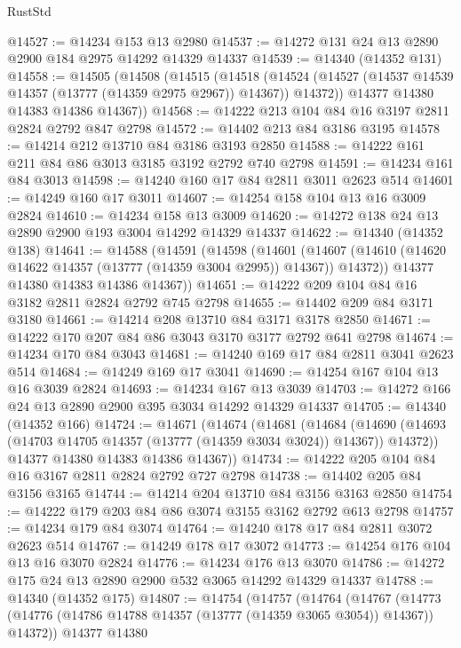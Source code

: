 \begin{lexlean}{RustStd}
\begin{coremodule}
@14527 := @14234 @153 @13 @2980
@14537 := @14272 @131 @24 @13 @2890 @2900 @184 @2975 @14292 @14329 @14337
@14539 := @14340 (@14352 @131)
@14558 := @14505
    (@14508
      (@14515
        (@14518
          (@14524 (@14527 (@14537 @14539 @14357 (@13777 (@14359 @2975 @2967)) @14367)) @14372))
        @14377
        @14380
        @14383
        @14386
        @14367))
@14568 := @14222 @213 @104 @84 @16 @3197 @2811 @2824 @2792 @847 @2798
@14572 := @14402 @213 @84 @3186 @3195
@14578 := @14214 @212 @13710 @84 @3186 @3193 @2850
@14588 := @14222 @161 @211 @84 @86 @3013 @3185 @3192 @2792 @740 @2798
@14591 := @14234 @161 @84 @3013
@14598 := @14240 @160 @17 @84 @2811 @3011 @2623 @514
@14601 := @14249 @160 @17 @3011
@14607 := @14254 @158 @104 @13 @16 @3009 @2824
@14610 := @14234 @158 @13 @3009
@14620 := @14272 @138 @24 @13 @2890 @2900 @193 @3004 @14292 @14329 @14337
@14622 := @14340 (@14352 @138)
@14641 := @14588
    (@14591
      (@14598
        (@14601
          (@14607 (@14610 (@14620 @14622 @14357 (@13777 (@14359 @3004 @2995)) @14367)) @14372))
        @14377
        @14380
        @14383
        @14386
        @14367))
@14651 := @14222 @209 @104 @84 @16 @3182 @2811 @2824 @2792 @745 @2798
@14655 := @14402 @209 @84 @3171 @3180
@14661 := @14214 @208 @13710 @84 @3171 @3178 @2850
@14671 := @14222 @170 @207 @84 @86 @3043 @3170 @3177 @2792 @641 @2798
@14674 := @14234 @170 @84 @3043
@14681 := @14240 @169 @17 @84 @2811 @3041 @2623 @514
@14684 := @14249 @169 @17 @3041
@14690 := @14254 @167 @104 @13 @16 @3039 @2824
@14693 := @14234 @167 @13 @3039
@14703 := @14272 @166 @24 @13 @2890 @2900 @395 @3034 @14292 @14329 @14337
@14705 := @14340 (@14352 @166)
@14724 := @14671
    (@14674
      (@14681
        (@14684
          (@14690 (@14693 (@14703 @14705 @14357 (@13777 (@14359 @3034 @3024)) @14367)) @14372))
        @14377
        @14380
        @14383
        @14386
        @14367))
@14734 := @14222 @205 @104 @84 @16 @3167 @2811 @2824 @2792 @727 @2798
@14738 := @14402 @205 @84 @3156 @3165
@14744 := @14214 @204 @13710 @84 @3156 @3163 @2850
@14754 := @14222 @179 @203 @84 @86 @3074 @3155 @3162 @2792 @613 @2798
@14757 := @14234 @179 @84 @3074
@14764 := @14240 @178 @17 @84 @2811 @3072 @2623 @514
@14767 := @14249 @178 @17 @3072
@14773 := @14254 @176 @104 @13 @16 @3070 @2824
@14776 := @14234 @176 @13 @3070
@14786 := @14272 @175 @24 @13 @2890 @2900 @532 @3065 @14292 @14329 @14337
@14788 := @14340 (@14352 @175)
@14807 := @14754
    (@14757
      (@14764
        (@14767
          (@14773 (@14776 (@14786 @14788 @14357 (@13777 (@14359 @3065 @3054)) @14367)) @14372))
        @14377
        @14380

\end{coremodule}
\end{lexlean}
